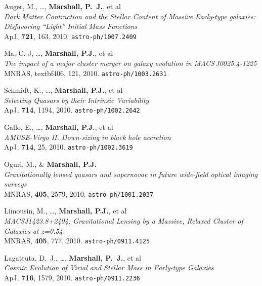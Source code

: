 \begin{revnumerate}
\item{{Auger}, M., \dots, \textbf{{Marshall}, P.~J.}, et al\\
\textit{Dark Matter Contraction and the Stellar Content of Massive
Early-type galaxies: Disfavoring ``Light'' Initial Mass Functions}\\
ApJ, \textbf{721}, 163, 2010.
\texttt{astro-ph/1007.2409}
}


\item{Ma, C.-J, \ldots, \textbf{Marshall, P.J.}, et al\\
\textit{The impact of a major cluster merger on galaxy evolution in MACS\,J0025.4-1225}\\
MNRAS, textbf{406}, 121, 2010.
\texttt{astro-ph/1003.2631}
}

\item{Schmidt, K., \ldots, \textbf{Marshall, P.J.}, et al\\
\textit{Selecting Quasars by their Intrinsic Variability}\\
ApJ, \textbf{714}, 1194, 2010.
\texttt{astro-ph/1002.2642}
}

\item{Gallo, E., \ldots, \textbf{Marshall, P.J.}, et al\\
\textit{AMUSE-Virgo II. Down-sizing in black hole accretion}\\
ApJ, \textbf{714}, 25, 2010.
\texttt{astro-ph/1002.3619}
}

\item{Oguri, M., \& \textbf{Marshall, P.J.}\\
\textit{Gravitationally lensed quasars and supernovae in future wide-field
optical imaging surveys}\\
MNRAS, \textbf{405}, 2579, 2010.
\texttt{astro-ph/1001.2037}
}

\item{Limousin, M., \ldots, \textbf{Marshall, P.J.}, et al\\
\textit{MACSJ1423.8+2404: Gravitational Lensing by a Massive, Relaxed Cluster
of Galaxies at z=0.54}\\
MNRAS, \textbf{405}, 777, 2010.
\texttt{astro-ph/0911.4125}
}

\item{Lagattuta, D.~J., \dots, \textbf{Marshall, P.~J.}, et al\\
\textit{Cosmic Evolution of Virial and Stellar Mass in Early-type Galaxies}\\
ApJ, \textbf{716}, 1579, 2010.
\texttt{astro-ph/0911.2236}
}


\end{revnumerate}
